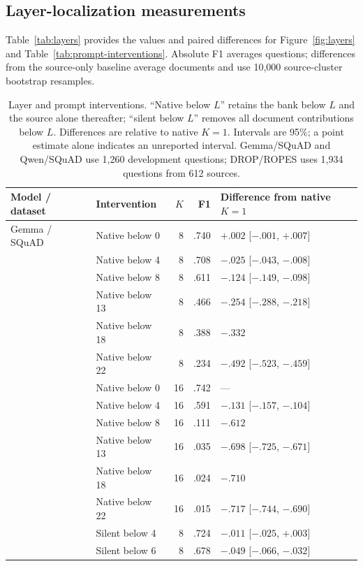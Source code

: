 \subsection{Layer-localization measurements}
Table~\ref{tab:layers} provides the values and paired differences for
Figure~\ref{fig:layers} and Table~\ref{tab:prompt-interventions}.
Absolute F1 averages questions; differences from the source-only baseline
average documents and use 10,000 source-cluster bootstrap resamples.

\begin{table}[t]
\centering
\caption{Layer and prompt interventions. ``Native below $L$'' retains the
bank below $L$ and the source alone thereafter; ``silent below $L$'' removes
all document contributions below $L$. Differences are relative to native
$K=1$. Intervals are 95\%; a point estimate alone indicates an unreported
interval. Gemma/SQuAD and Qwen/SQuAD use 1,260 development questions;
DROP/ROPES uses 1,934 questions from 612 sources.}
\label{tab:layers}
\label{tab:layer-contrasts}
\label{tab:generality}
\small\setlength{\tabcolsep}{5pt}
\begin{tabular}{@{}llrrl@{}}
\toprule
Model / dataset & Intervention & $K$ & F1 & Difference from native $K=1$ \\
\midrule
Gemma / SQuAD & Native below 0 & 8 & .740 & $+.002$ [$-.001$, $+.007$] \\
& Native below 4 & 8 & .708 & $-.025$ [$-.043$, $-.008$] \\
& Native below 8 & 8 & .611 & $-.124$ [$-.149$, $-.098$] \\
& Native below 13 & 8 & .466 & $-.254$ [$-.288$, $-.218$] \\
& Native below 18 & 8 & .388 & $-.332$ \\
& Native below 22 & 8 & .234 & $-.492$ [$-.523$, $-.459$] \\
& Native below 0 & 16 & .742 & --- \\
& Native below 4 & 16 & .591 & $-.131$ [$-.157$, $-.104$] \\
& Native below 8 & 16 & .111 & $-.612$ \\
& Native below 13 & 16 & .035 & $-.698$ [$-.725$, $-.671$] \\
& Native below 18 & 16 & .024 & $-.710$ \\
& Native below 22 & 16 & .015 & $-.717$ [$-.744$, $-.690$] \\
& Silent below 4 & 8 & .724 & $-.011$ [$-.025$, $+.003$] \\
& Silent below 6 & 8 & .678 & $-.049$ [$-.066$, $-.032$] \\

\end{tabular}
\end{table}
